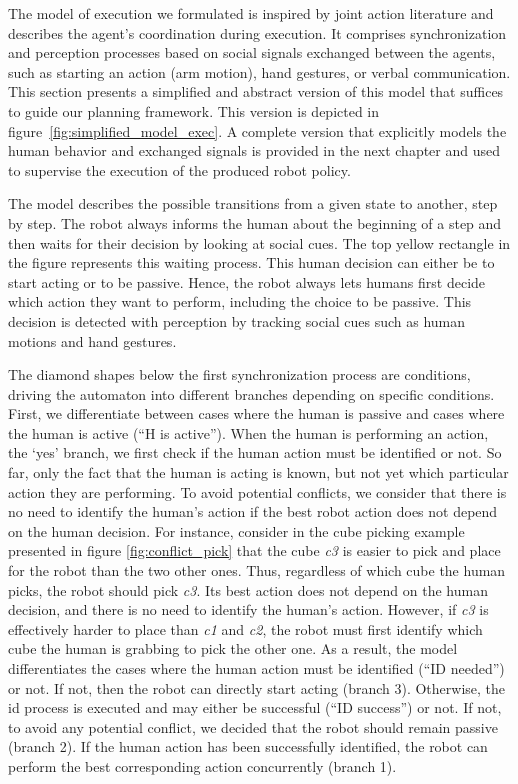
The model of execution we formulated is inspired by joint action literature and describes the agent's coordination during execution. It comprises synchronization and perception processes based on social signals exchanged between the agents, such as starting an action (arm motion), hand gestures, or verbal communication. 
This section presents a simplified and abstract version of this model that suffices to guide our planning framework. This version is depicted in figure~\ref{fig:simplified_model_exec}. A complete version that explicitly models the human behavior and exchanged signals is provided in the next chapter and used to supervise the execution of the produced robot policy.  

The model describes the possible transitions from a given state to another, step by step. The robot always informs the human about the beginning of a step and then waits for their decision by looking at social cues. The top yellow rectangle in the figure represents this waiting process. This human decision can either be to start acting or to be passive. Hence, the robot always lets humans first decide which action they want to perform, including the choice to be passive. This decision is detected with perception by tracking social cues such as human motions and hand gestures.

The diamond shapes below the first synchronization process are conditions, driving the automaton into different branches depending on specific conditions. First, we differentiate between cases where the human is passive and cases where the human is active (``H is active''). 
When the human is performing an action, the `yes' branch, we first check if the human action must be identified or not. So far, only the fact that the human is acting is known, but not yet which particular action they are performing. 
To avoid potential conflicts, we consider that there is no need to identify the human's action if the best robot action does not depend on the human decision. For instance, consider in the cube picking example presented in figure \ref{fig:conflict_pick} that the cube \emph{c3} is easier to pick and place for the robot than the two other ones. Thus, regardless of which cube the human picks, the robot should pick \emph{c3}. Its best action does not depend on the human decision, and there is no need to identify the human's action. However, if \emph{c3} is effectively harder to place than \emph{c1} and \emph{c2}, the robot must first identify which cube the human is grabbing to pick the other one. As a result, the model differentiates the cases where the human action must be identified (``ID needed'') or not. If not, then the robot can directly start acting (branch 3). Otherwise, the \acrfull{id} process is executed and may either be successful (``ID success'') or not. If not, to avoid any potential conflict, we decided that the robot should remain passive (branch 2). If the human action has been successfully identified, the robot can perform the best corresponding action concurrently (branch 1).

